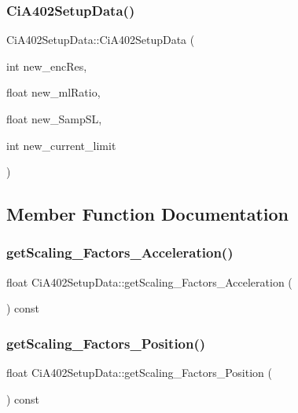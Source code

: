 \subsubsection{\texorpdfstring{Ci\+A402\+Setup\+Data()}{CiA402SetupData()}\hspace{0.1cm}{\footnotesize\ttfamily [2/2]}}
{\footnotesize\ttfamily Ci\+A402\+Setup\+Data\+::\+Ci\+A402\+Setup\+Data (\begin{DoxyParamCaption}\item[{int}]{new\+\_\+enc\+Res,  }\item[{float}]{new\+\_\+ml\+Ratio,  }\item[{float}]{new\+\_\+\+Samp\+SL,  }\item[{int}]{new\+\_\+current\+\_\+limit }\end{DoxyParamCaption})}



\subsection{Member Function Documentation}
\mbox{\label{classCiA402SetupData_af2a3390595f6c08c6bf1057d58789a3e}} 
\subsubsection{\texorpdfstring{get\+Scaling\+\_\+\+Factors\+\_\+\+Acceleration()}{getScaling\_Factors\_Acceleration()}}
{\footnotesize\ttfamily float Ci\+A402\+Setup\+Data\+::get\+Scaling\+\_\+\+Factors\+\_\+\+Acceleration (\begin{DoxyParamCaption}{ }\end{DoxyParamCaption}) const}

\mbox{\label{classCiA402SetupData_aaa5fa09da2e5a3874b19cb1ad7403176}} 
\subsubsection{\texorpdfstring{get\+Scaling\+\_\+\+Factors\+\_\+\+Position()}{getScaling\_Factors\_Position()}}
{\footnotesize\ttfamily float Ci\+A402\+Setup\+Data\+::get\+Scaling\+\_\+\+Factors\+\_\+\+Position (\begin{DoxyParamCaption}{ }\end{DoxyParamCaption}) const}

